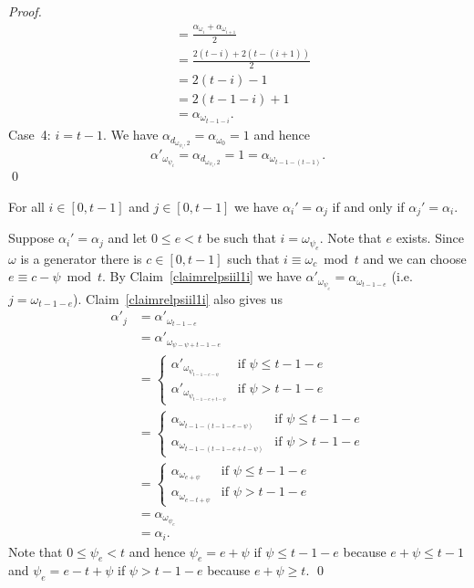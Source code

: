 \documentclass[10pt,a4paper]{amsart}
\begin{document}
\begin{proof}
\begin{align*}
&= \frac{\alpha_{\omega_i} + \alpha_{\omega_{i+1}}}{2}\\
&= \frac{2(t-i) + 2(t-(i+1))}{2}\\
&= 2(t-i)-1\\
&= 2(t-1-i)+1\\
&= \alpha_{\omega_{t-1-i}}.
\end{align*}
Case~4: $i=t-1$. We have $\alpha_{d_{\omega_{\psi_i},2}} = \alpha_{\omega_0} = 1$ and hence
\begin{displaymath}
\alpha'_{\omega_{\psi_i}} = \alpha_{d_{\omega_{\psi_i},2}} = 1 = \alpha_{\omega_{t-1-(t-1)}}.
\end{displaymath}
\qed

\begin{claim}\label{claimrelalphaialphaj}
For all $i \in [0,t-1]$ and $j \in [0,t-1]$ we have $\alpha_i' = \alpha_j$ if and only if $\alpha_j' = \alpha_i$.
\end{claim}
Suppose $\alpha_i' = \alpha_j$ and let $0 \leq e < t$ be such that $i = \omega_{\psi_e}$. Note that $e$ exists. Since $\omega$ is a generator there is $c \in [0,t-1]$ such that $i \equiv \omega_c \bmod t$ and we can choose $e \equiv c - \psi \bmod t$. By Claim~\ref{claimrelpsiil1i} we have $\alpha'_{\omega_{\psi_e}} = \alpha_{\omega_{t-1-e}}$ (i.e. $j = \omega_{t-1-e}$). Claim~\ref{claimrelpsiil1i} also gives us
\begin{align*}
\alpha'_j &= \alpha'_{\omega_{t-1-e}}\\
&= \alpha'_{\omega_{\psi-\psi+t-1-e}}\\
&= \begin{cases}
\alpha'_{\omega_{\psi_{t-1-e-\psi}}} & \text{if } \psi \leq t-1-e\\
\alpha'_{\omega_{\psi_{t-1-e+t-\psi}}} & \text{if } \psi > t-1-e
\end{cases}\\
&= \begin{cases}
\alpha_{\omega_{t-1-(t-1-e-\psi)}} & \text{if } \psi \leq t-1-e\\
\alpha_{\omega_{t-1-(t-1-e+t-\psi)}} & \text{if } \psi > t-1-e
\end{cases}\\
&= \begin{cases}
\alpha_{\omega_{e+\psi}} & \text{if } \psi \leq t-1-e\\
\alpha_{\omega_{e-t+\psi}} & \text{if } \psi > t-1-e
\end{cases}\\
&= \alpha_{\omega_{\psi_e}}\\
&= \alpha_i.
\end{align*}
Note that $0 \leq \psi_e < t$ and hence $\psi_e = e + \psi$ if $\psi \leq t-1-e$ because $e + \psi \leq t-1$ and $\psi_e = e - t + \psi$ if $\psi > t-1-e$ because $e+\psi \geq t$.
\qed


\end{proof}
\end{document}
